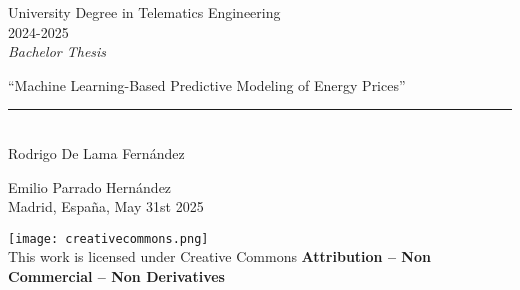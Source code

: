 \documentclass[12pt]{report} %
\begin{document}



\begin{titlepage}
	\begin{sffamily}
	\color{azulUC3M}
	\begin{center}
		\begin{figure}[H] %
		\end{figure}
		\vspace{2.5cm}
		\begin{Large}
			University Degree in Telematics Engineering\\			
			 2024-2025\\ %
			\vspace{2cm}		
			\textsl{Bachelor Thesis}
			\bigskip
			
		\end{Large}
		 	{\Huge ``Machine Learning-Based Predictive Modeling of Energy Prices''}\\
		 	\vspace*{0.5cm}
	 		\rule{10.5cm}{0.1mm}\\
			\vspace*{0.9cm}
			{\LARGE Rodrigo De Lama Fernández}\\ 
			\vspace*{1cm}
		\begin{Large}
			Emilio Parrado Hernández\\
			Madrid, España, May 31st 2025\\
		\end{Large}
	\end{center}
	\vfill
	\color{black}
	\texttt{[image: creativecommons.png]}\\ %
    This work is licensed under Creative Commons \textbf{Attribution – Non Commercial – Non Derivatives}
	\end{sffamily}
\end{titlepage}


\newpage %
\thispagestyle{empty}
\mbox{}
\end{document}
